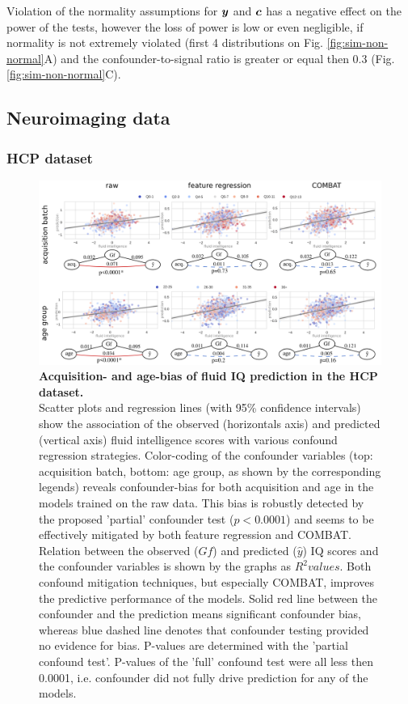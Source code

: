 \documentclass{article}
\begin{document}
Violation of the normality assumptions for $\boldsymbol{y}$ and $\boldsymbol{c}$ has a negative effect on the power of the tests, however the loss of power is low or even negligible, if normality is not extremely violated (first 4 distributions on Fig. \ref{fig:sim-non-normal}A) and the confounder-to-signal ratio is greater or equal then 0.3 (Fig. \ref{fig:sim-non-normal}C).

\subsection{Neuroimaging data}
\subsubsection*{HCP dataset}

\begin{figure}[!b]
  \centering
  \includegraphics[width=0.75\paperwidth]{fig/fig_hcp.png}
  \caption{\textbf{Acquisition- and age-bias of fluid IQ prediction in the HCP dataset.} \\
  Scatter plots and regression lines (with 95\% confidence intervals) show the association of the observed (horizontals axis) and predicted (vertical axis) fluid intelligence scores with various confound regression strategies. Color-coding of the confounder variables (top: acquisition batch, bottom: age group, as shown by the corresponding legends) reveals confounder-bias for both acquisition and age in the models trained on the raw data. This bias is robustly detected by the proposed 'partial' confounder test ($p<0.0001$) and seems to be effectively mitigated by both feature regression and COMBAT.
  Relation between the observed ($Gf$) and predicted ($\hat{y}$) IQ scores and the confounder variables is shown by the graphs as $R^2 values$. Both confound mitigation techniques, but especially COMBAT, improves the predictive performance of the models.
  Solid red line between the confounder and the prediction means significant confounder bias, whereas blue dashed line denotes that confounder testing provided no evidence for bias. P-values are determined with the 'partial confound test'. P-values of the 'full' confound test were all less then 0.0001, i.e. confounder did not fully drive prediction for any of the models.
  }
  \label{fig:hcp}
\end{figure}
\end{document}
